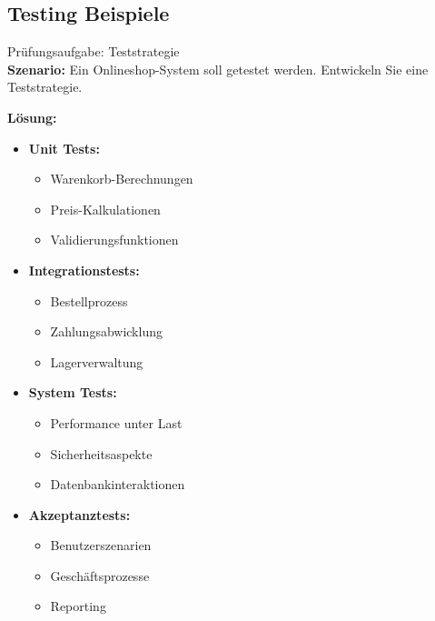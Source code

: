 \subsection{Testing Beispiele}

\begin{example2}{Prüfungsaufgabe: Teststrategie}\\
\textbf{Szenario:}
Ein Onlineshop-System soll getestet werden. Entwickeln Sie eine Teststrategie.

\textbf{Lösung:}
\begin{itemize}
    \item \textbf{Unit Tests:}
    \begin{itemize}
        \item Warenkorb-Berechnungen
        \item Preis-Kalkulationen
        \item Validierungsfunktionen
    \end{itemize}
    
    \item \textbf{Integrationstests:}
    \begin{itemize}
        \item Bestellprozess
        \item Zahlungsabwicklung
        \item Lagerverwaltung
    \end{itemize}
    
    \item \textbf{System Tests:}
    \begin{itemize}
        \item Performance unter Last
        \item Sicherheitsaspekte
        \item Datenbankinteraktionen
    \end{itemize}
    
    \item \textbf{Akzeptanztests:}
    \begin{itemize}
        \item Benutzerszenarien
        \item Geschäftsprozesse
        \item Reporting
    \end{itemize}
\end{itemize}
\end{example2}

